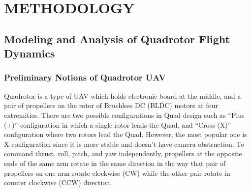 \chapter{METHODOLOGY}

\section{Modeling and Analysis of Quadrotor
 Flight Dynamics}
 
\subsection{Preliminary Notions of Quadrotor UAV}

Quadrotor is a type of UAV which holds electronic board at the middle, and a pair of propellers on the rotor of Brushless DC (BLDC) motors\cite{mohidem2022application} at four extremities. There are two possible configurations in Quad design such as ``Plus (+)'' configuration in which a single rotor leads the Quad, and ``Cross (X)'' configuration where two rotors lead the Quad. However, the most popular one is X-configuration since it is more stable and doesn’t have camera obstruction. To command thrust, roll, pitch, and yaw independently, propellers at the opposite ends of the same arm rotate in the same direction in the way that pair of propellers on one arm rotate clockwise (CW) while the other pair rotate in counter clockwise (CCW) direction\cite{akhil2012simulation}.



